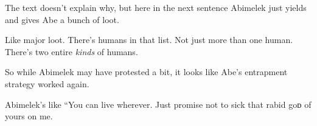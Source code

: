{
}
{
}
{
	The text doesn't explain why, but here in the next sentence Abimelek just yields and gives Abe a bunch of loot.

	Like major loot. There's humans in that list. Not just more than one human. There's two entire \emph{kinds} of humans.

	So while Abimelek may have protested a bit, it looks like Abe's entrapment strategy worked again.
}

{
}
{
}
{
	Abimelek's like ``You can live wherever. Just promise not to sick that rabid goᴅ of yours on me.
}

